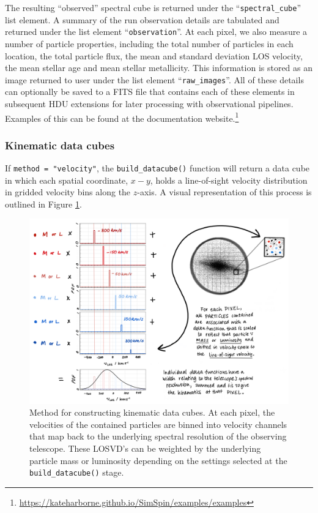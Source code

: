 \documentclass[
  journal=pasa,
  manuscript=research-paper, %
  year=2020,
  volume=37,
]{cup-journal}
\newcommand{\builddatacube}[1]{\texttt{build\_datacube()}#1}
\begin{document}
The resulting ``observed'' spectral cube is returned under the ``\texttt{spectral\_cube}'' list element. 
A summary of the run observation details are tabulated and returned under the list element ``\texttt{observation}''. 
At each pixel, we also measure a number of particle properties, including the total number of particles in each location, the total particle flux, the mean and standard deviation LOS velocity, the mean stellar age and mean stellar metallicity.  
This information is stored as an image returned to user under the list element ``\texttt{raw\_images}''.
All of these details can optionally be saved to a FITS file that contains each of these elements in subsequent HDU extensions for later processing with observational pipelines. 
Examples of this can be found at the documentation website.\footnote{\url{https://kateharborne.github.io/SimSpin/examples/examples}}

\subsubsection{Kinematic data cubes}
\label{sec:velocity_cubes}

If \texttt{method = "velocity"}, the \builddatacube{} function will return a data cube in which each spatial coordinate, $x-y$, holds a line-of-sight velocity distribution in gridded velocity bins along the $z$-axis. 
A visual representation of this process is outlined in Figure \ref{fig:velocity_methodology}.

\begin{figure}
    \centering
    \includegraphics[keepaspectratio, width=14.5cm]{velocity_mode_methodology_delta.png}
    \caption{Method for constructing kinematic data cubes. At each pixel, the velocities of the contained particles are binned into velocity channels that map back to the underlying spectral resolution of the observing telescope. These LOSVD's can be weighted by the underlying particle mass or luminosity depending on the settings selected at the \builddatacube{} stage.}
    \label{fig:velocity_methodology}
\end{figure}
\end{document}
